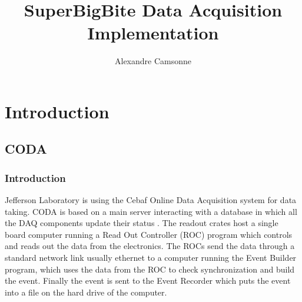 \documentclass{article}
\title {SuperBigBite Data Acquisition Implementation}
\author{Alexandre Camsonne}
\begin{document}
\section{Introduction}
\subsection{CODA}
\subsubsection{Introduction}
Jefferson Laboratory is using the Cebaf Online Data Acquisition system for data taking.
CODA is based on a main server interacting with a database in which all the DAQ components update their status . The readout crates host a single board computer running a Read Out Controller (ROC) program which controls and reads out the data from the electronics. The ROCs send the data through a standard network link usually ethernet to a computer running the Event Builder program, which uses the data from the ROC to check synchronization and build the event. Finally the event is sent to the Event Recorder which puts the event into a file on the hard drive of the computer.
\end{document}
